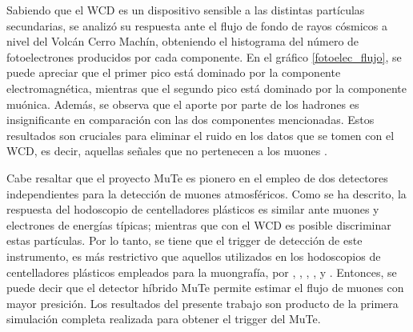 \documentclass[12pt,oneside,openany,letter]{book}
\begin{document}
Sabiendo que el WCD es un dispositivo sensible a las distintas part\'iculas secundarias, se analiz\'o su respuesta ante el flujo de fondo de rayos c\'osmicos a nivel del Volc\'an Cerro Mach\'in, obteniendo el histograma del n\'umero de fotoelectrones producidos por cada componente. En el gr\'afico \ref{fotoelec_flujo}, se puede apreciar que el primer pico est\'a dominado por la componente electromagn\'etica, mientras que el segundo pico est\'a dominado por la componente mu\'onica. Adem\'as, se observa que el aporte por parte de los hadrones es insignificante en comparaci\'on con las dos componentes mencionadas. Estos resultados son cruciales para eliminar el ruido en los datos que se tomen con el WCD, es decir, aquellas se\~nales que no pertenecen a los muones \cite{SuarezDuran2016}. 

Cabe resaltar que el proyecto MuTe es pionero en el empleo de dos detectores independientes para la detecci\'on de muones atmosf\'ericos. Como se ha descrito, la respuesta del hodoscopio de centelladores pl\'asticos es similar ante muones y electrones de energ\'ias t\'ipicas; mientras que con el WCD es posible discriminar estas part\'iculas. Por lo tanto, se tiene que el trigger de detecci\'on de este instrumento, es m\'as restrictivo que aquellos utilizados en los hodoscopios de centelladores pl\'asticos empleados para la muongraf\'ia, por \cite{Fujii-etal2013}, \cite{lesparre-etal2012-gim}, \cite{Tanaka-etal2009}, \cite{Nagamine-etal1995}, \cite{aguiar2015geant4} y \cite{tang2016large}. Entonces, se puede decir que el detector h\'ibrido MuTe permite estimar el flujo de muones con mayor presici\'on. Los resultados del presente trabajo son producto de la primera simulaci\'on completa realizada para obtener el trigger del MuTe. 
\end{document}
